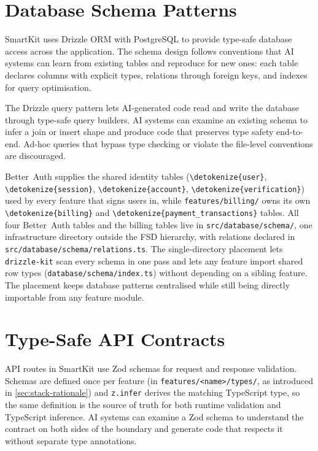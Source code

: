\documentclass[12pt,a4paper]{report}
\newcommand{\code}[1]{\texttt{\nolinkurl{\detokenize{#1}}}}
\newcommand{\pkg}[1]{\texttt{\nolinkurl{#1}}}
\DeclareRobustCommand{\filename}[1]{\bgroup\urlstyle{tt}\nolinkurl{#1}\egroup}
\begin{document}
\section{Database Schema Patterns}

SmartKit uses Drizzle ORM with PostgreSQL to provide type-safe database access across the application. The schema design follows conventions that AI systems can learn from existing tables and reproduce for new ones: each table declares columns with explicit types, relations through foreign keys, and indexes for query optimisation.

The Drizzle query pattern lets AI-generated code read and write the database through type-safe query builders. AI systems can examine an existing schema to infer a join or insert shape and produce code that preserves type safety end-to-end. Ad-hoc queries that bypass type checking or violate the file-level conventions are discouraged.

Better~Auth supplies the shared identity tables (\code{user}, \code{session}, \code{account}, \code{verification}) used by every feature that signs users in, while \filename{features/billing/} owns its own \code{billing} and \code{payment\_transactions} tables. All four Better~Auth tables and the billing tables live in \filename{src/database/schema/}, one infrastructure directory outside the FSD hierarchy, with relations declared in \filename{src/database/schema/relations.ts}. The single-directory placement lets \pkg{drizzle-kit} scan every schema in one pass and lets any feature import shared row types (\filename{database/schema/index.ts}) without depending on a sibling feature. The placement keeps database patterns centralised while still being directly importable from any feature module.

\section{Type-Safe API Contracts}

API routes in SmartKit use Zod schemas for request and response validation. Schemas are defined once per feature (in \filename{features/<name>/types/}, as introduced in \autoref{sec:stack-rationale}) and \pkg{z.infer} derives the matching TypeScript type, so the same definition is the source of truth for both runtime validation and TypeScript inference. AI systems can examine a Zod schema to understand the contract on both sides of the boundary and generate code that respects it without separate type annotations.
\end{document}
